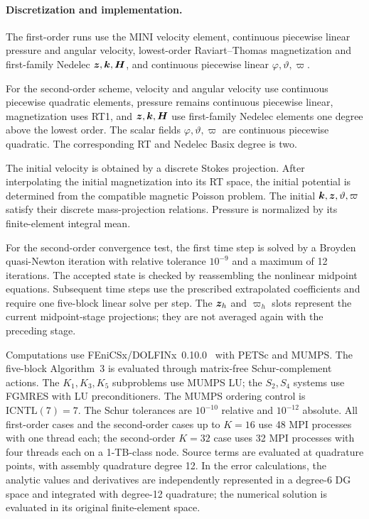 \paragraph{Discretization and implementation.}
The first-order runs use the MINI velocity element, continuous piecewise
linear pressure and angular velocity, lowest-order Raviart--Thomas
magnetization and first-family Nedelec $\boldsymbol z,\boldsymbol k,\boldsymbol H$, and
continuous piecewise linear $\varphi,\vartheta,\varpi$.

For the second-order scheme, velocity and angular velocity use continuous
piecewise quadratic elements, pressure remains continuous piecewise linear, magnetization
uses RT1, and $\boldsymbol z,\boldsymbol k,\boldsymbol H$ use first-family Nedelec elements
one degree above the lowest order. The scalar fields
$\varphi,\vartheta,\varpi$ are continuous piecewise quadratic.
The corresponding RT and Nedelec Basix degree is two.

The initial velocity is obtained by a discrete Stokes projection.
After interpolating the initial magnetization into its RT space,
the initial potential is determined from the compatible magnetic Poisson
problem. The initial $\boldsymbol k,\boldsymbol z,\vartheta,\varpi$ satisfy their discrete
mass-projection relations. Pressure is normalized by its finite-element
integral mean.

For the second-order convergence test, the first time step is solved
by a Broyden quasi-Newton iteration with
relative tolerance $10^{-9}$ and a maximum of 12 iterations.
The accepted state is checked by reassembling the nonlinear midpoint
equations. Subsequent time steps use the prescribed extrapolated
coefficients and require one five-block linear solve per step.
The $\boldsymbol z_h$ and $\varpi_h$ slots represent the current midpoint-stage
projections; they are not averaged again with the preceding stage.

Computations use FEniCSx/DOLFINx~0.10.0~\cite{Barattafenics}
with PETSc and MUMPS. The five-block Algorithm~3 is evaluated through
matrix-free Schur-complement actions. The $K_1,K_3,K_5$ subproblems use
MUMPS LU; the $S_2,S_4$ systems use FGMRES with LU preconditioners.
The MUMPS ordering control is $\mathrm{ICNTL}(7)=7$.
The Schur tolerances are $10^{-10}$ relative and $10^{-12}$ absolute.
All first-order cases and the second-order cases up to $K=16$ use
48 MPI processes with one thread each; the second-order $K=32$ case
uses 32 MPI processes with four threads each on a 1-TB-class node.
Source terms are evaluated at quadrature points, with assembly
quadrature degree 12. In the error calculations, the analytic values
and derivatives are independently represented in a degree-6 DG space
and integrated with degree-12 quadrature; the numerical solution is
evaluated in its original finite-element space.

